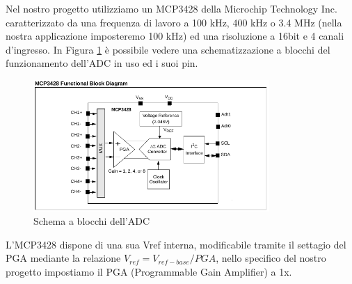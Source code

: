 \documentclass[10pt]{article}
\begin{document}
		Nel nostro progetto utilizziamo un MCP3428 della Microchip Technology Inc. caratterizzato da una frequenza di lavoro a 100 kHz, 400 kHz o 3.4 MHz (nella nostra applicazione imposteremo 100 kHz) ed una risoluzione a 16bit e 4 canali d'ingresso. In Figura \ref{fig:adc} è possibile vedere una schematizzazione a blocchi del funzionamento dell'ADC in uso ed i suoi pin.
		\begin{figure}[h]
			\centering
			\includegraphics[width=0.8\textwidth]{src/adc_block}
			\caption{Schema a blocchi dell'ADC}\label{fig:adc}
		\end{figure}

		L'MCP3428 dispone di una sua Vref interna, modificabile tramite il settagio del PGA mediante la relazione $V_{ref}=V_{ref-base}/PGA$, nello specifico del nostro progetto impostiamo il PGA (Programmable Gain Amplifier) a 1x.
\end{document}
